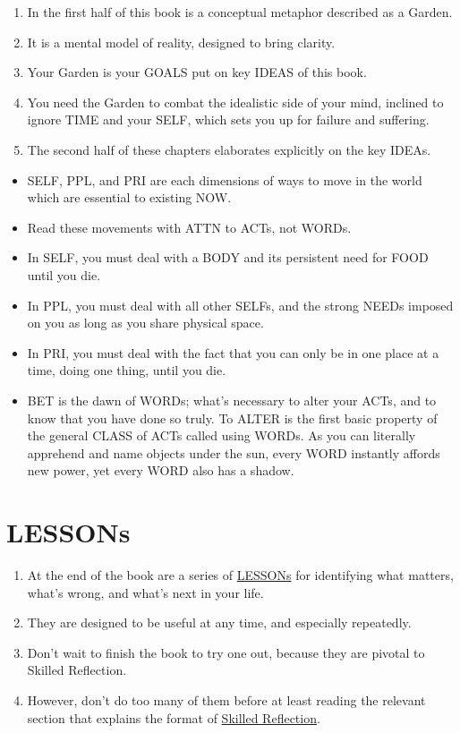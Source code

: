 \documentclass[
]{book}
\providecommand{\tightlist}{%
  \setlength{\itemsep}{0pt}\setlength{\parskip}{0pt}}
\begin{document}
\begin{enumerate}
\def\labelenumi{\arabic{enumi}.}
\setcounter{enumi}{35}
\tightlist
\item
  In the first half of this book is a conceptual metaphor described as a Garden.
\item
  It is a mental model of reality, designed to bring clarity.
\item
  Your Garden is your GOALS put on key IDEAS of this book.
\item
  You need the Garden to combat the idealistic side of your mind, inclined to ignore TIME and your SELF, which sets you up for failure and suffering.
\item
  The second half of these chapters elaborates explicitly on the key IDEAs.
\end{enumerate}

\begin{itemize}
\tightlist
\item
  SELF, PPL, and PRI are each dimensions of ways to move in the world
  which are essential to existing NOW.
\item
  Read these movements with ATTN to ACTs, not WORDs.
\item
  In SELF, you must deal with a BODY and its persistent need for FOOD until you die.
\item
  In PPL, you must deal with all other SELFs, and the strong NEEDs imposed on you as long as you share physical space.
\item
  In PRI, you must deal with the fact that you can only be in one place at a time, doing one thing, until you die.
\item
  BET is the dawn of WORDs; what's necessary to alter your ACTs, and to know that you have done so truly. To ALTER is the first basic property of the general CLASS of ACTs called using WORDs.
  As you can literally apprehend and name objects under the sun, every WORD instantly affords new power, yet every WORD also has a shadow.
\end{itemize}

\hypertarget{lessons}{%
\section{LESSONs}\label{lessons}}

\begin{enumerate}
\def\labelenumi{\arabic{enumi}.}
\setcounter{enumi}{40}
\tightlist
\item
  At the end of the book are a series of \protect\hyperlink{zero-or-one}{LESSONs} for identifying what matters, what's wrong, and what's next in your life.
\item
  They are designed to be useful at any time, and especially repeatedly.
\item
  Don't wait to finish the book to try one out, because they are pivotal to Skilled Reflection.
\item
  However, don't do too many of them before at least reading the relevant section that explains the format of \protect\hyperlink{skilled-reflection}{Skilled Reflection}.
\end{enumerate}
\end{document}

